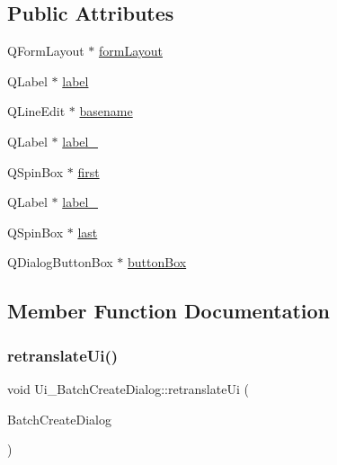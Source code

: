 \subsection*{Public Attributes}
\begin{DoxyCompactItemize}
\item 
Q\+Form\+Layout $\ast$ \mbox{\hyperlink{class_ui___batch_create_dialog_a2ad381db4952a292dbcdcf0474cfc9d0}{form\+Layout}}
\item 
Q\+Label $\ast$ \mbox{\hyperlink{class_ui___batch_create_dialog_a51ddf7084151863eaf2abcf69e64c0fb}{label}}
\item 
Q\+Line\+Edit $\ast$ \mbox{\hyperlink{class_ui___batch_create_dialog_a6af6664914d8209c45e2e30ba7b87314}{basename}}
\item 
Q\+Label $\ast$ \mbox{\hyperlink{class_ui___batch_create_dialog_aa58eb51d4aaa9c850298968af12f954f}{label\+\_}}
\item 
Q\+Spin\+Box $\ast$ \mbox{\hyperlink{class_ui___batch_create_dialog_a629ddbf35e948d6f14bcf6991f726ab5}{first}}
\item 
Q\+Label $\ast$ \mbox{\hyperlink{class_ui___batch_create_dialog_a9415f65bcbc26ebb144f5ca06e7414bc}{label\+\_}}
\item 
Q\+Spin\+Box $\ast$ \mbox{\hyperlink{class_ui___batch_create_dialog_a493f34f4ffa8f3e5f2daea2013af5560}{last}}
\item 
Q\+Dialog\+Button\+Box $\ast$ \mbox{\hyperlink{class_ui___batch_create_dialog_a19f2ae9be5b40933571d626565f960df}{button\+Box}}
\end{DoxyCompactItemize}


\subsection{Member Function Documentation}
\mbox{\label{class_ui___batch_create_dialog_a49c63fbdf016bdee3e5b4a16e7b164cd}} 
\subsubsection{\texorpdfstring{retranslateUi()}{retranslateUi()}}
{\footnotesize\ttfamily void Ui\+\_\+\+Batch\+Create\+Dialog\+::retranslate\+Ui (\begin{DoxyParamCaption}\item[{Q\+Dialog $\ast$}]{Batch\+Create\+Dialog }\end{DoxyParamCaption})\hspace{0.3cm}{\ttfamily [inline]}}

